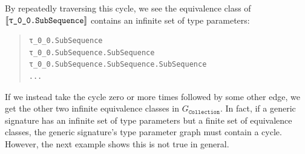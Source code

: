 \documentclass[../generics]{subfiles}
\begin{document}
\begin{example}
\begin{center}
\begin{tikzpicture}[x=3.2cm,y=1.3cm]
\end{tikzpicture}
\end{center}
By repeatedly traversing this cycle, we see the equivalence class of $\archetype{\rT.SubSequence}$ contains an infinite set of type parameters:
\begin{quote}
\begin{verbatim}
τ_0_0.SubSequence
τ_0_0.SubSequence.SubSequence
τ_0_0.SubSequence.SubSequence.SubSequence
...
\end{verbatim}
\end{quote}
If we instead take the cycle zero or more times followed by some other edge, we get the other two infinite equivalence classes in $G_\texttt{Collection}$. In fact, if a generic signature has an infinite set of type parameters but a finite set of equivalence classes, the generic signature's type parameter graph must contain a cycle. However, the next example shows this is not true in general.
\end{example}
\end{document}
